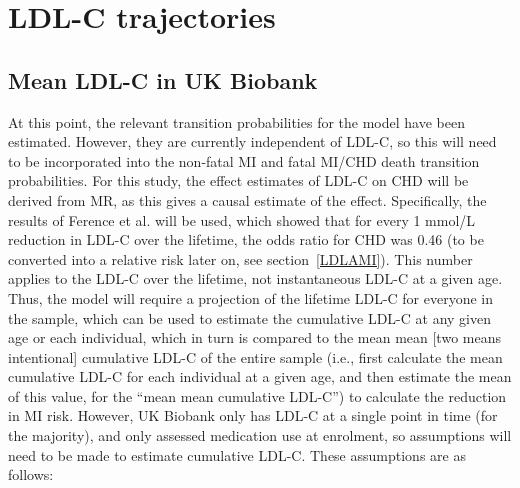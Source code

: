 \documentclass[11pt]{article}
\begin{document}
\clearpage
\pagebreak
\section{LDL-C trajectories}
\label{LDLtrajsection}

\subsection{Mean LDL-C in UK Biobank}

At this point, the relevant transition probabilities for the model have been estimated. 
However, they are currently independent of LDL-C, so this will need to be incorporated into the non-fatal MI
and fatal MI/CHD death transition probabilities. 
For this study, the effect estimates of LDL-C on CHD will be derived from MR, 
as this gives a causal estimate of the effect. Specifically, the results of 
Ference et al. \cite{FerenceJAMA2019} will be used, 
which showed that for every 1 mmol/L reduction in LDL-C over the lifetime, 
the odds ratio for CHD was 0.46 (to be converted into a relative risk later on, see section~\ref{LDLAMI}). 
This number applies to the LDL-C over the lifetime, not instantaneous LDL-C at a given age. 
Thus, the model will require a projection of the lifetime LDL-C for everyone in the sample, which can be used
to estimate the cumulative LDL-C at any given age or each individual, 
which in turn is compared to the mean mean [two means intentional] cumulative 
LDL-C of the entire sample (i.e., first calculate the mean cumulative LDL-C for each individual at a given age, and
then estimate the mean of this value, for the ``mean mean cumulative LDL-C'') to calculate the reduction in MI risk. 
However, UK Biobank only has LDL-C at a single point in time (for the majority), and only assessed medication use at 
enrolment, so assumptions will need to be made to estimate cumulative LDL-C. These assumptions are as follows:
\end{document}
